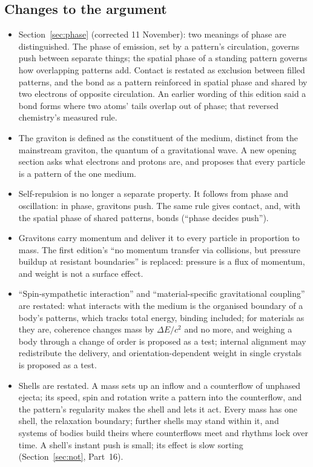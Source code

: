 \documentclass[11pt,a4paper]{article}
\begin{document}
\subsection*{Changes to the argument}
\begin{itemize}
\item Section~\ref{sec:phase} (corrected 11 November): two meanings of phase are distinguished. The phase of emission, set by a pattern's circulation, governs push between separate things; the spatial phase of a standing pattern governs how overlapping patterns add. Contact is restated as exclusion between filled patterns, and the bond as a pattern reinforced in spatial phase and shared by two electrons of opposite circulation. An earlier wording of this edition said a bond forms where two atoms' tails overlap out of phase; that reversed chemistry's measured rule.
\item The graviton is defined as the constituent of the medium, distinct from the mainstream graviton, the quantum of a gravitational wave. A new opening section asks what electrons and protons are, and proposes that every particle is a pattern of the one medium.
\item Self-repulsion is no longer a separate property. It follows from phase and oscillation: in phase, gravitons push. The same rule gives contact, and, with the spatial phase of shared patterns, bonds (``phase decides push'').
\item Gravitons carry momentum and deliver it to every particle in proportion to mass. The first edition's ``no momentum transfer via collisions, but pressure buildup at resistant boundaries'' is replaced: pressure is a flux of momentum, and weight is not a surface effect.
\item ``Spin-sympathetic interaction'' and ``material-specific gravitational coupling'' are restated: what interacts with the medium is the organised boundary of a body's patterns, which tracks total energy, binding included; for materials as they are, coherence changes mass by $\Delta E/c^2$ and no more, and weighing a body through a change of order is proposed as a test; internal alignment may redistribute the delivery, and orientation-dependent weight in single crystals is proposed as a test.
\item Shells are restated. A mass sets up an inflow and a counterflow of unphased ejecta; its speed, spin and rotation write a pattern into the counterflow, and the pattern's regularity makes the shell and lets it act. Every mass has one shell, the relaxation boundary; further shells may stand within it, and systems of bodies build theirs where counterflows meet and rhythms lock over time. A shell's instant push is small; its effect is slow sorting (Section~\ref{sec:not}, Part~16).

\end{itemize}
\end{document}
